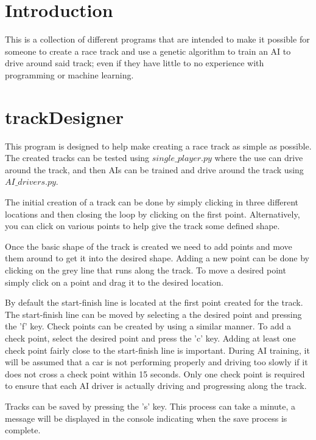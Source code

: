 \documentclass[12pt]{article}
\begin{document}


\section{Introduction}

This is a collection of different programs that are intended to make it possible for someone to create a race track and use a genetic algorithm to train an AI to drive around said track; even if they have little to no experience with programming or machine learning. 



\section{trackDesigner}

This program is designed to help make creating a race track as simple as possible. The created tracks can be tested using $single\_player.py$ where the use can drive around the track, and then AIs can be trained and drive around the track using $AI\_drivers.py$.

The initial creation of a track can be done by simply clicking in three different locations and then closing the loop by clicking on the first point. Alternatively, you can click on various points to help give the track some defined shape.

Once the basic shape of the track is created we need to add points and move them around to get it into the desired shape. Adding a new point can be done by clicking on the grey line that runs along the track. To move a desired point simply click on a point and drag it to the desired location.

By default the start-finish line is located at the first point created for the track. The start-finish line can be moved by selecting a the desired point and pressing the 'f' key. Check points can be created by using a similar manner. To add a check point, select the desired point and press the 'c' key. Adding at least one check point fairly close to the start-finish line is important. During AI training, it will be assumed that a car is not performing properly and driving too slowly if it does not cross a check point within 15 seconds. Only one check point is required to ensure that each AI driver is actually driving and progressing along the track.

Tracks can be saved by pressing the 's' key. This process can take a minute, a message will be displayed in the console indicating when the save process is complete.
\end{document}
